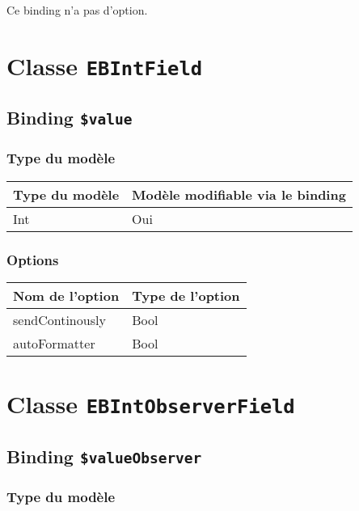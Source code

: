 Ce binding n'a pas d'option.








\section{Classe \texttt{EBIntField}}

\subsection{Binding \texttt{\$value}}

\subsubsection{Type du modèle}

\begin{tabular}{|l|l|}
\hline
\textbf{Type du modèle} & \textbf{Modèle modifiable via le binding}\\
\hline
Int & Oui\\
\hline
\end{tabular}
\subsubsection{Options}

\begin{tabular}{|l|l|}
\hline
\textbf{Nom de l'option} & \textbf{Type de l'option}\\
\hline
sendContinously & Bool\\
\hline
autoFormatter & Bool\\
\hline
\end{tabular}







\section{Classe \texttt{EBIntObserverField}}

\subsection{Binding \texttt{\$valueObserver}}

\subsubsection{Type du modèle}

